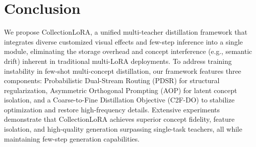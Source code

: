 \section{Conclusion}
\label{sec:conclusion}
We propose CollectionLoRA, a unified multi-teacher distillation framework that integrates diverse customized visual effects and few-step inference into a single module, eliminating the storage overhead and concept interference (e.g., semantic drift) inherent in traditional multi-LoRA deployments. To address training instability in few-shot multi-concept distillation, our framework features three components: Probabilistic Dual-Stream Routing (PDSR) for structural regularization, Asymmetric Orthogonal Prompting  (AOP) for latent concept isolation, and a Coarse-to-Fine Distillation Objective (C2F-DO) to stabilize optimization and restore high-frequency details. Extensive experiments demonstrate that CollectionLoRA achieves superior concept fidelity, feature isolation, and high-quality generation surpassing single-task teachers, all while maintaining few-step generation capabilities.